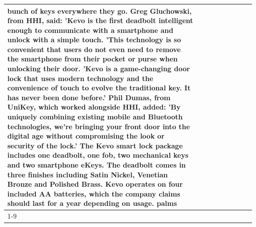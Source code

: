 \begin{table}[H]
\begin{tabular}{lllrlllll}
bunch of keys everywhere they go. Greg Gluchowski, from HHI, said: 'Kevo is the first deadbolt intelligent enough to communicate with a smartphone and unlock with a simple touch. 'This technology is so convenient that users do not even need to remove the smartphone from their pocket or purse when unlocking their door. 'Kevo is a game-changing door lock that uses modern technology and the convenience of touch to evolve the traditional key. It has never been done before.' Phil Dumas, from UniKey, which worked alongside HHI, added: 'By uniquely combining existing mobile and Bluetooth technologies, we’re bringing your front door into the digital age without compromising the look or security of the lock.' The Kevo smart lock package includes one deadbolt, one fob, two mechanical keys and two smartphone eKeys. The deadbolt comes in three finishes including Satin Nickel, Venetian Bronze and Polished Brass. Kevo operates on four included AA batteries, which the company claims should last for a year depending on usage. palms \\
\cline{1-9}

\end{tabular}
\end{table}
